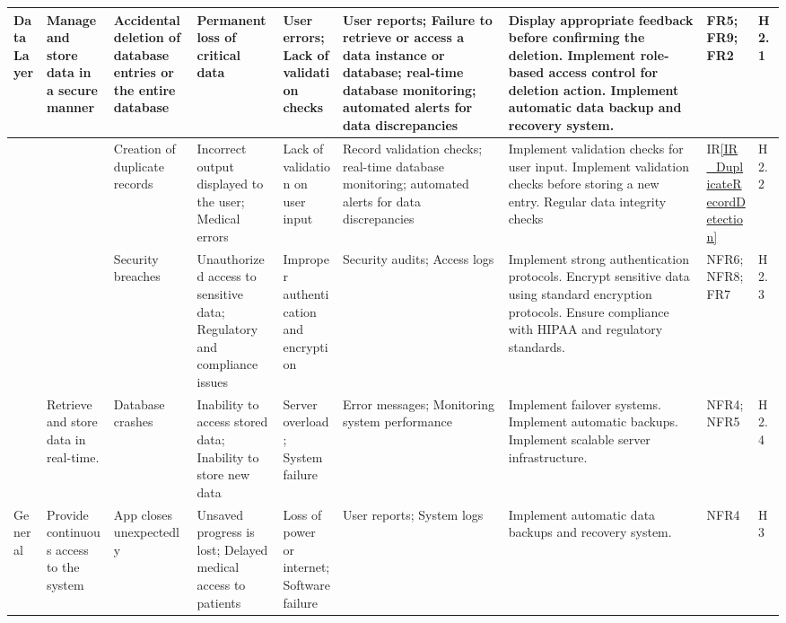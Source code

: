 \documentclass{article}
\begin{document}
\begin{landscape}
\begin{longtable}{|p{1.5cm}|p{2cm}|p{2.6cm}|p{2cm}|p{2cm}|p{2cm}|p{3.5cm}|p{1cm}|p{0.8cm}|}
        \midrule
        Data Layer & \raggedright Manage and store data in a secure manner & \raggedright Accidental deletion of database entries or the entire database & \raggedright Permanent loss of critical data & \raggedright User errors; Lack of validation checks & \raggedright User reports; Failure to retrieve or access a data instance or database; real-time database monitoring; automated alerts for data discrepancies & \raggedright Display appropriate feedback before confirming the deletion. Implement role-based access control for deletion action. Implement automatic data backup and recovery system. & FR5; FR9; FR2 & H2.1 \\ 
        \midrule
        & & \raggedright Creation of duplicate records & \raggedright Incorrect output displayed to the user; Medical errors & \raggedright Lack of validation on user input & \raggedright Record validation checks; real-time database monitoring; automated alerts for data discrepancies & \raggedright Implement validation checks for user input. Implement validation checks before storing a new entry. Regular data integrity checks & IR\ref{IR_DuplicateRecordDetection} & H2.2 \\ 
        \midrule
        & & \raggedright Security breaches & \raggedright Unauthorized access to sensitive data; Regulatory and compliance issues & \raggedright Improper authentication and encryption & \raggedright Security audits; Access logs & \raggedright Implement strong authentication protocols. Encrypt sensitive data using standard encryption protocols. Ensure compliance with HIPAA and regulatory standards. & NFR6; NFR8; FR7 & H2.3 \\ 
        \midrule
        & \raggedright Retrieve and store data in real-time. & \raggedright Database crashes & \raggedright Inability to access stored data; Inability to store new data & \raggedright Server overload; System failure & \raggedright Error messages; Monitoring system performance & \raggedright Implement failover systems. Implement automatic backups. Implement scalable server infrastructure. & NFR4; NFR5 & H2.4 \\ 
        \midrule
        General & \raggedright Provide continuous access to the system & \raggedright App closes unexpectedly & \raggedright Unsaved progress is lost; Delayed medical access to patients & \raggedright Loss of power or internet; Software failure & \raggedright User reports; System logs & \raggedright Implement automatic data backups and recovery system. & NFR4 & H3 \\

\end{longtable}
\end{landscape}
\end{document}
